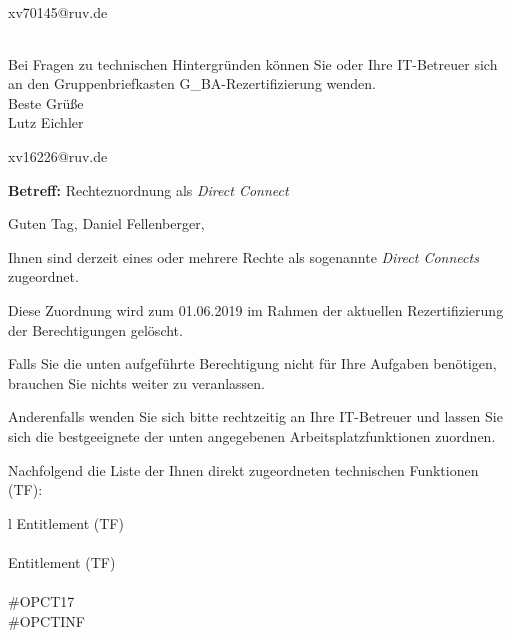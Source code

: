 \documentclass[a4paper,landscape,12pt]{letter}
\begin{document}
\begin{letter}{xv70145@ruv.de\hfill \break}
\begin{tiny}
\begin{longtable}{|p{35mm}|p{15mm}|p{25mm}|p{10mm}|p{40mm}|p{50mm}|p{50mm}|}
\hline
		\end{longtable}
		\end{tiny}
	
\begin{minipage}{\textwidth}
			Bei Fragen zu technischen Hintergründen können Sie 
			oder Ihre IT-Betreuer sich an den Gruppenbriefkasten 
			G\_BA-Rezertifizierung
			wenden.\\
			\linebreak
			Beste Grüße\\
			Lutz Eichler
	\end{minipage}
	\end{letter}
	
\begin{letter}{xv16226@ruv.de\hfill \break}
\begin{normalsize}
	\opening{\textbf{Betreff:} Rechtezuordnung als \emph{Direct Connect}}
	\begin{normalsize} \hfill
	\end{normalsize}

	\begin{normalsize}
		Guten Tag, 
	Daniel Fellenberger, \hfill \break
	\end{normalsize}
	\end{normalsize}
	
\begin{normalsize}
	Ihnen sind derzeit eines oder mehrere Rechte als sogenannte \emph{Direct Connects} zugeordnet.
	
	Diese Zuordnung wird zum 01.06.2019 im Rahmen der aktuellen Rezertifizierung der Berechtigungen gelöscht.
	
	Falls Sie die unten aufgeführte Berechtigung nicht für Ihre Aufgaben benötigen, 
	brauchen Sie nichts weiter zu veranlassen.
	
	Anderenfalls wenden Sie sich bitte rechtzeitig an Ihre IT-Betreuer 
	und lassen Sie sich die bestgeeignete der unten angegebenen Arbeitsplatzfunktionen zuordnen.
	\end{normalsize}
	
\begin{normalsize}
	Nachfolgend die Liste der Ihnen direkt zugeordneten technischen Funktionen (TF):

	\begin{longtable}{l}
		Entitlement (TF) \\ \hline
		\endfirsthead
		\\\hline
		Entitlement (TF) \\ \hline
		\endhead %
		\multicolumn{1}{r@{}}{Fortsetzung \ldots}\\
		\endfoot
		\hline
		\endlastfoot
	\#OPCT17\\\#OPCTINF\\
	\end{longtable}
	\end{normalsize}
	

\end{letter}
\end{document}
